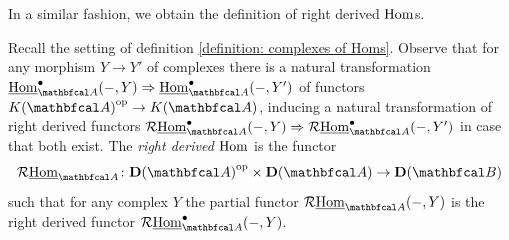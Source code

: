 In a similar fashion, we obtain the definition of right derived ${\operatorname{Hom}}$s.
\begin{definition}
	\label{definition: right derived Homs}
	
	Recall the setting of definition \ref{definition: complexes of Homs}. Observe that for any morphism $Y\to Y'$ of complexes there is a natural transformation $\eHom_\category{A}^\bullet(-, Y) \Rightarrow \eHom_\category{A}^\bullet(-, Y')$ of functors $\homotopyCategoryOfComplexes{\category{A}}^\op \to \homotopyCategoryOfComplexes{\category{A}}$, inducing a natural transformation of right derived functors $\RightD\eHom_\category{A}^\bullet(-, Y)\Rightarrow \RightD\eHom_\category{A}^\bullet(-, Y')$ in case that both exist. The \emph{right derived ${\operatorname{Hom}}$} is the functor
		$$\RightD\eHom_\category{A}\colon \derived{\category{A}}^\op\times\derived{\category{A}}\to \derived{\category{B}}$$
	such that for any complex $Y$ the partial functor $\RightD\eHom_\category{A}(-, Y)$ is the right derived functor $\RightD\eHom_\category{A}^\bullet(-, Y)$.
\end{definition}

